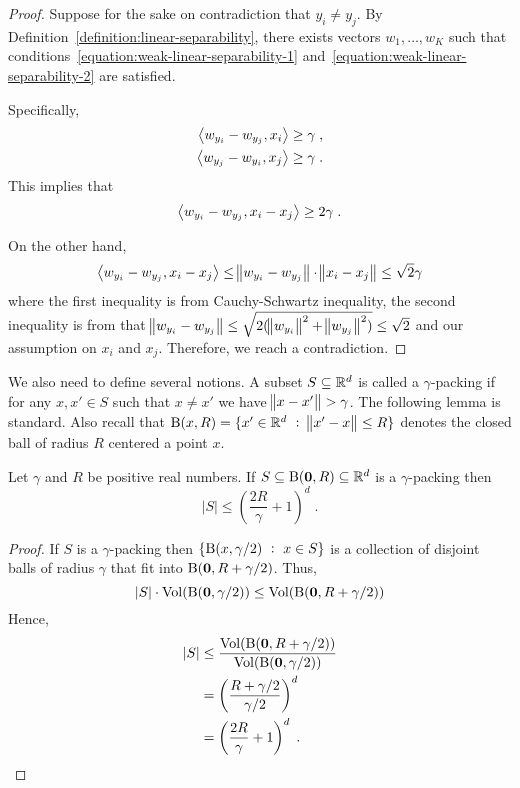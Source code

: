 \begin{proof}
Suppose for the sake on contradiction that $y_i \neq y_j$. By
Definition~\ref{definition:linear-separability}, there exists
vectors $w_1, \ldots, w_K$ such that
conditions~\eqref{equation:weak-linear-separability-1}
and~\eqref{equation:weak-linear-separability-2} are satisfied.

Specifically,
\begin{align*}
\left\langle w_{y_i} - w_{y_j}, x_i \right\rangle & \ge \gamma \; , \\
\left\langle w_{y_j} - w_{y_i}, x_j \right\rangle & \ge \gamma \; .
\end{align*}
This implies that
$$
\left\langle w_{y_i} - w_{y_j}, x_i - x_j \right\rangle \ge 2\gamma \; .
$$

On the other hand,
$$
\left\langle w_{y_i} - w_{y_j}, x_i - x_j \right\rangle \le \norm{w_{y_i} - w_{y_j}} \cdot \norm{x_i - x_j} \le \sqrt{2} \gamma
$$
where the first inequality is from Cauchy-Schwartz inequality, the second
inequality is from that $\norm{w_{y_i} - w_{y_j}} \le \sqrt{2(\norm{w_{y_i}}^2 +
\norm{w_{y_j}}^2)} \leq \sqrt{2}$ and our assumption on $x_i$ and $x_j$.
Therefore, we reach a contradiction.
\end{proof}

We also need to define several notions. A subset $S \subseteq \mathbb{R}^d$ is called a
$\gamma$-packing if for any $x,x' \in S$ such that $x \neq x'$ we have $\norm{x -
x'} > \gamma$. The following lemma is standard. Also recall that $\operatorname{B}(x,R) = \{ x'
\in \mathbb{R}^d ~:~ \norm{x' - x} \le R \}$ denotes the closed ball of radius $R$
centered a point $x$.

\begin{lemma}
\label{lemma:size-of-packing}
Let $\gamma$ and $R$ be positive real numbers.
If $S \subseteq \operatorname{B}(\mathbf{0},R) \subseteq \mathbb{R}^d$ is a $\gamma$-packing then
$$
|S| \le \left( \frac{2R}{\gamma} + 1 \right)^d \; .
$$
\end{lemma}

\begin{proof}
If $S$ is a $\gamma$-packing then $\{ \operatorname{B}(x,\gamma/2) ~:~ x \in S \}$
is a collection of disjoint balls of radius $\gamma$ that fit into $\operatorname{B}(\mathbf{0},R + \gamma/2)$.
Thus,
$$
|S| \cdot \operatorname*{Vol}(\operatorname{B}(\mathbf{0}, \gamma/2)) \le \operatorname*{Vol}(\operatorname{B}(\mathbf{0},R + \gamma/2))
$$
Hence,
\begin{align*}
|S|
& \le \frac{\operatorname*{Vol}(\operatorname{B}(\mathbf{0},R + \gamma/2))}{\operatorname*{Vol}(\operatorname{B}(\mathbf{0}, \gamma/2))} \\
& = \left( \frac{R + \gamma/2}{\gamma/2} \right)^d \\
& = \left( \frac{2R}{\gamma} + 1 \right)^d \; .
\end{align*}
\end{proof}

